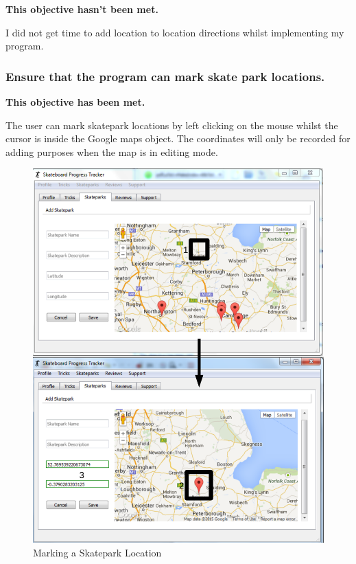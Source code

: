 \textbf{This objective hasn't been met.}

I did not get time to add location to location directions whilst implementing my program.

\subsubsection {Ensure that the program can mark skate park locations.}

\textbf{This objective has been met.}

The user can mark skatepark locations by left clicking on the mouse whilst the cursor is inside the Google maps object. The coordinates will only be recorded for adding purposes when the map is in editing mode.

\begin{figure}[H]
    \includegraphics[width=\textwidth]{./Evaluation/images/MarkerEvidence.pdf}
    \caption{Marking a Skatepark Location} \label{fig:MarkerEvidence}
\end{figure}

